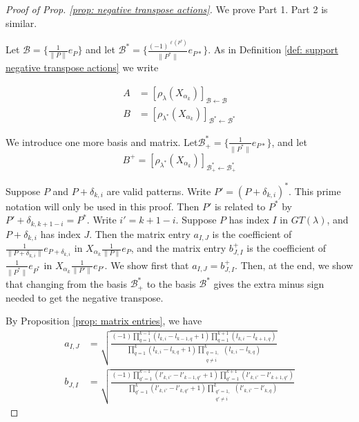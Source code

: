 \documentclass{amsart}[12pt]
\theoremstyle{definition}
\numberwithin{equation}{section}
\begin{document}
\begin{proof}[Proof of Prop. \ref{prop: negative transpose actions}]
We prove Part 1. Part 2 is similar.

  
Let  $\mathscr{B} = \{ \frac{1}{\|P \|} e_{P}\} $ and let 
$\mathscr{B}^{*} = \{ \frac{(-1)^{\ell(P^{*})}}{\|  P^{*} \|}e_{P*}\}$. As in Definition \ref{def: support negative transpose actions} we write
  
\begin{align*}
  A &= [\rho_{\lambda} (X_{\alpha_k})]_{\mathscr{B}\leftarrow
        \mathscr{B}}\\
  B &= [\rho_{\lambda^{*}} (X_{\alpha_k})]_{\mathscr{B}^{*}\leftarrow
        \mathscr{B}^{*}}
\end{align*}

We introduce one more basis and matrix. Let$\mathscr{B}_{+}^{*} = \{ \frac{1}{\|  P^{*} \|}e_{P*}\}$, and let
\[
  B^{+} = [\rho_{\lambda^{*}} (X_{\alpha_k})]_{\mathscr{B}_{+}^{*}\leftarrow
        \mathscr{B}_{+}^{*}}
\]

  
Suppose $P$ and $P+\delta_{k,i}$ are valid patterns. Write $P' =
(P+\delta_{k,i})^{*}$. This prime notation will only be used in this
proof. Then $P'$ is related to $P^{*}$ by $P'+\delta_{k,k+1-i} = P^{*}$. Write $i' = k+1-i$. Suppose $P$ has index $I$ in $GT(\lambda)$, and $P+\delta_{k,i}$ has index $J$. Then the matrix entry $a_{I,J}$ is the  coefficient of $\frac{1}{\| P + \delta_{k,i}\|} e_{P + \delta_{k,i}}$ in $X_{\alpha_k} \frac{1}{\| P \|} e_P$, and the matrix entry $b_{J,I}^{+}$ is the coefficient of $\frac{1}{\| P^*\|} e_{P^*}$ in $X_{\alpha_k} \frac{1}{\| P' \|} e_{P'}$. We show first that $a_{I,J} = b_{J,I}^{+}$. Then, at the end, we show that changing from the basis $\mathscr{B}_{+}^{*}$ to the basis $\mathscr{B}^{*}$ gives the extra minus sign needed to get the negative transpose.


By Proposition \ref{prop: matrix entries}, we have
\begin{align*}
a_{I,J} &=    \sqrt{\frac{(-1)
      \displaystyle \prod_{q=1}^{k-1}(l_{k,i}-l_{k-1,q}+1)
      \displaystyle \prod_{q=1}^{k+1}
      (l_{k,i}-l_{k+1,q})}{\displaystyle
      \prod_{q=1}^{k}(l_{k,i}-l_{k,q}+1) \displaystyle \prod_{\substack{q=1,\\q\neq i}}^{k} (l_{k,i}-l_{k,q})}}\\
b_{J,I} &=    \sqrt{\frac{(-1)
      \displaystyle \prod_{q'=1}^{k-1}(l'_{k,i'}-l'_{k-1,q'}+1)
      \displaystyle \prod_{q'=1}^{k+1}
      (l'_{k,i'}-l'_{k+1,q'})}{\displaystyle
      \prod_{q'=1}^{k}(l'_{k,i'}-l'_{k,q'}+1) \displaystyle \prod_{\substack{q'=1,\\q'\neq i}}^{k} (l'_{k,i'}-l'_{k,q})}}
\end{align*}


\end{proof}
\end{document}
